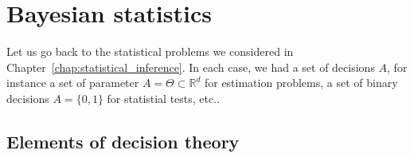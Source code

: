 \documentclass[
	fontsize=11pt, %
	twoside=false, %
	numbers=noenddot, %
]{kaobook}
\newcommand{\R}{\mathbb R}
\begin{document}









\mainmatter %











\setchapterpreamble[u]{\margintoc}
\chapter{Bayesian statistics}
\label{chap:bayesian_statistics}

Let us go back to the statistical problems we considered in Chapter~\ref{chap:statistical_inference}.
In each case, we had a set of decisions $A$, for instance a set of parameter $A = \Theta \subset \R^d$ for estimation problems, a set of binary decisions $A = \{ 0, 1 \}$ for statistial tests, etc..

\section{Elements of decision theory} %
\label{sec:elements_of_decision_theory}
\end{document}
